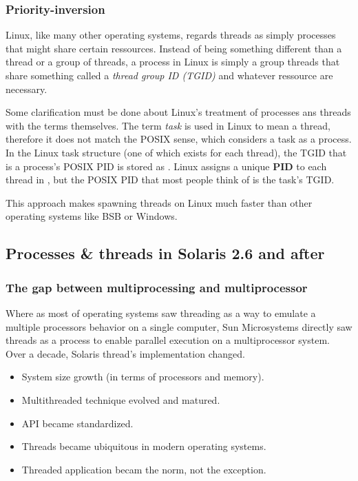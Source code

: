 \begin{frame}
\frametitle{Priority-inversion}

Linux, like many other operating systems, regards threads as simply processes that might share certain ressources. Instead of being something different than a thread or a group of threads, a process in Linux is simply a group threads that share something called a \textit{thread group ID (TGID)} and whatever ressource are necessary. 

\-

Some clarification must be done about Linux's treatment of processes ans threads with the terms themselves. The term \textit{task} is used in Linux to mean a thread, therefore it does not match the POSIX sense, which considers a task as a process. In the Linux task structure  (one of which exists for each thread), the TGID that is a process's POSIX PID is stored as . Linux assigns a unique \textbf{PID} to each thread in , but the POSIX PID that most people think of is the task's TGID.

This approach makes spawning threads on Linux much faster than other operating systems like BSB or Windows.

\end{frame}

\subsection{Processes \& threads in Solaris 2.6 and after}


\begin{frame}
\frametitle{The gap between multiprocessing and multiprocessor}

Where as most of operating systems saw threading as a way to emulate a multiple processors behavior on a single computer, Sun Microsystems directly saw threads as a process to enable parallel execution on a multiprocessor system. Over a decade, Solaris thread's implementation changed. 

\begin{itemize}
\item
System size growth (in terms of processors and memory).
\item
Multithreaded technique evolved and matured.
\item
API became standardized.
\item
Threads became ubiquitous in modern operating systems.
\item
Threaded application becam the norm, not the exception.
\end{itemize}

\end{frame}

